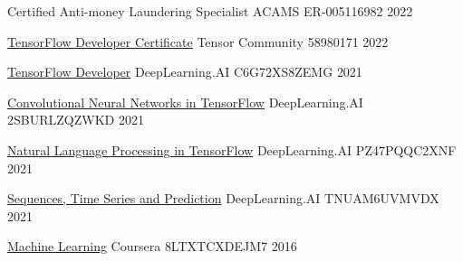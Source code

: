

\begin{cvhonors}

  \cvhonor
    {Certified Anti-money Laundering Specialist} %
    {ACAMS} %
    {ER-005116982} %
    {2022} %

  \cvhonor
    {\href{https://www.credential.net/e5de3c84-fa55-47a4-baa3-8647d3382c83#gs.4pyfwp}{TensorFlow Developer Certificate}} %
    {Tensor Community} %
    {58980171} %
    {2022} %

  \cvhonor
    {\href{https://coursera.org/share/d24a2f5a313185bb3a495a48b6ac47f4}{TensorFlow Developer}} %
    {DeepLearning.AI} %
    {C6G72XS8ZEMG} %
    {2021} %

  \cvhonor
    {\href{https://coursera.org/share/8b0f38a21751093cd4e675efe20e301a}{Convolutional Neural Networks in TensorFlow}} %
    {DeepLearning.AI} %
    {2SBURLZQZWKD} %
    {2021} %

  \cvhonor
    {\href{https://coursera.org/share/a9184c166a0904b922353861310ed5f1}{Natural Language Processing in TensorFlow}} %
    {DeepLearning.AI} %
    {PZ47PQQC2XNF} %
    {2021} %

  \cvhonor
    {\href{https://coursera.org/share/b57e8309df71161826cf27f9633d9e29}{Sequences, Time Series and Prediction}} %
    {DeepLearning.AI} %
    {TNUAM6UVMVDX} %
    {2021} %

  \cvhonor
    {\href{https://coursera.org/share/1159a4e9cea239b1a2d87dee39062653}{Machine Learning}} %
    {Coursera} %
    {8LTXTCXDEJM7} %
    {2016} %

\end{cvhonors}
